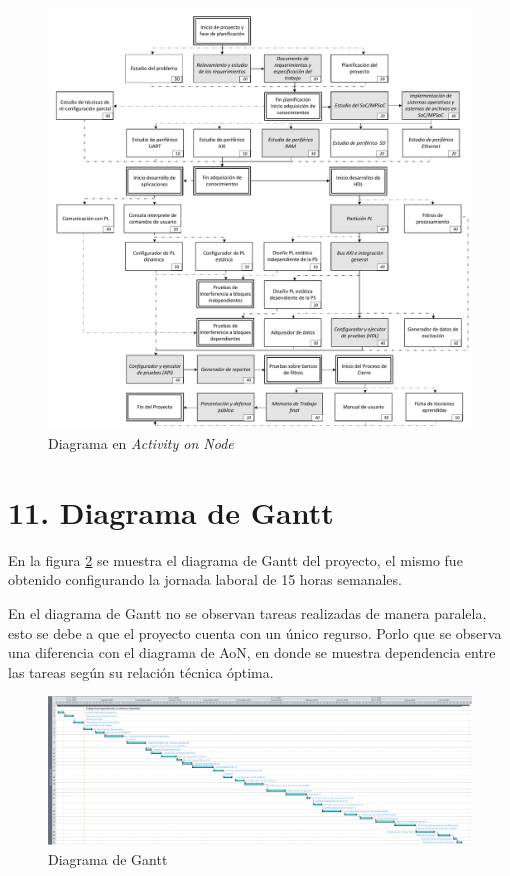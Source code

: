 \documentclass[
11pt, %
]{charter}
\begin{document}
\begin{figure}[hb]
\centering 
\includegraphics[width=1.03\textwidth]{./Figuras/AoN.pdf}
\caption{Diagrama en \textit{Activity on Node}}
\label{fig:AoN}
\end{figure}

\section{11. Diagrama de Gantt}
\label{sec:gantt}

En la figura \ref{fig:diagGantt} se muestra el diagrama de Gantt del proyecto, el mismo fue obtenido configurando la jornada laboral de 15 horas semanales.

En el diagrama de Gantt no se observan tareas realizadas de manera paralela,  esto se debe a que el proyecto cuenta con un único regurso. Porlo que se observa una diferencia con el diagrama de AoN, en donde se muestra dependencia entre las tareas según su relación técnica óptima.


\begin{figure}[h]
\centering 
\includegraphics[angle=90, height=0.98\textheight]{./Figuras/Gantt-real.png}
\caption{Diagrama de Gantt}
\label{fig:diagGantt}
\end{figure}
\end{document}
